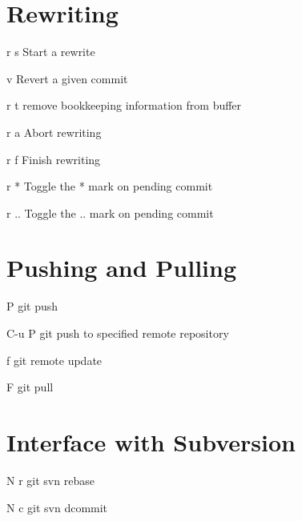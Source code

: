 \documentclass[11pt,a4paper]{article}
\begin{document}
\begin{multicols}{2}
\section{Rewriting}
\begin{eqlist}
\item[r s] Start a rewrite
\item[v] Revert a given commit
\item[r t] remove bookkeeping information from buffer
\item[r a] Abort rewriting
\item[r f] Finish rewriting
\item[r *] Toggle the * mark on pending commit
\item[r ..] Toggle the .. mark on pending commit
\end{eqlist}

\section{Pushing and Pulling}
\begin{eqlist}
\item[P] git push
\item[C-u P] git push to specified remote repository
\item[f] git remote update
\item[F] git pull
\end{eqlist}

\section{Interface with Subversion}
\begin{eqlist}
\item[N r] git svn rebase
\item[N c] git svn dcommit
\end{eqlist}

\end{multicols}

\let\thefootnote\relax{} %
\end{document}
